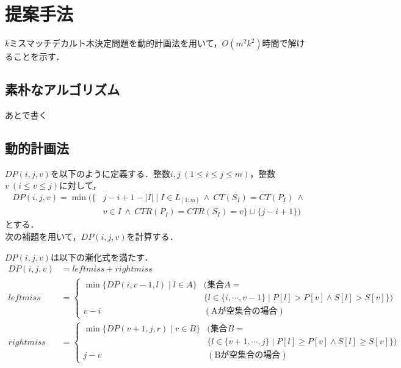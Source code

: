 \chapter{提案手法}
$k$ミスマッチデカルト木決定問題を動的計画法を用いて，$O(m^2k^2)$時間で解けることを示す．
\section{素朴なアルゴリズム}
あとで書く
\section{動的計画法}
$DP(i,j,v)$を以下のように定義する．整数$i,j\ (1\leq i \leq j \leq m)$，整数$v\ (i\leq v \leq j)$に対して，
\begin{displaymath}
  \begin{aligned}
    DP(i,j,v) = \min(\{ & j-i+1-|I| \mid I\in L_{[1:m]}\ \land\  CT(S_{I})=CT(P_{I})\ \land \nonumber \\
                       & v\in I\ \land\ CTR(P_I)=CTR(S_I)=v \} \cup \{j-i+1\})
  \end{aligned}
\end{displaymath}
とする．\\
次の補題を用いて，$DP(i,j,v)$を計算する．
\begin{lemma}
  $DP(i,j,v)$は以下の漸化式を満たす．
  \begin{displaymath}
    \begin{aligned}
      DP(i,j,v) &= leftmiss + rightmiss\\
      leftmiss &=
        \begin{cases}
          \min\{DP(i,v-1,l) \mid l \in A\} & (\text{集合}A=\\& \{l \in \{i,\cdots, v-1\}\mid P[l]>P[v] \land S[l]>S[v]\})\\
          v-i & (\text{Aが空集合の場合})
        \end{cases}\\
      rightmiss &=
        \begin{cases}
          \min\{DP(v+1,j,r) \mid r \in B\} & (\text{集合}B=\\&\{l \in \{v+1,\cdots, j\}\mid P[l]\geq P[v] \land S[l]\geq S[v]\})\\
          j-v & (\text{Bが空集合の場合})
        \end{cases}
    \end{aligned}
  \end{displaymath}
\end{lemma}

